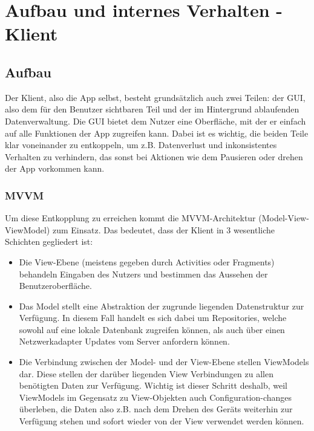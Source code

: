 \documentclass[parskip=full,11pt]{scrartcl}
\begin{document}
\section{Aufbau und internes Verhalten - Klient}

\subsection{Aufbau}
Der Klient, also die App selbst, besteht grundsätzlich auch zwei Teilen:
der GUI, also dem für den Benutzer sichtbaren Teil und der im Hintergrund
ablaufenden Datenverwaltung.
Die GUI bietet dem Nutzer eine Oberfläche, mit der er einfach auf alle
Funktionen der App zugreifen kann.
Dabei ist es wichtig, die beiden Teile klar voneinander zu entkoppeln,
um z.B. Datenverlust und inkonsistentes Verhalten zu verhindern, das sonst
bei Aktionen wie dem Pausieren oder drehen der App vorkommen kann.

\subsubsection{MVVM}
Um diese Entkopplung zu erreichen kommt die MVVM-Architektur
(Model-View-ViewModel) zum Einsatz.
Das bedeutet, dass der Klient in 3 wesentliche Schichten gegliedert ist:
\begin{itemize}
	\item Die View-Ebene (meistens gegeben durch Activities oder Fragments)
        behandeln Eingaben des Nutzers und bestimmen das Aussehen der
        Benutzeroberfläche.
	\item Das Model stellt eine Abstraktion der zugrunde liegenden
        Datenstruktur zur Verfügung. In diesem Fall handelt es sich dabei um
        Repositories, welche sowohl auf eine lokale Datenbank zugreifen können,
        als auch über einen Netzwerkadapter Updates vom Server anfordern
        können.
	\item Die Verbindung zwischen der Model- und der View-Ebene stellen
        ViewModels dar. Diese stellen der darüber liegenden View Verbindungen
        zu allen benötigten Daten zur Verfügung.
	    Wichtig ist dieser Schritt deshalb, weil ViewModels im Gegensatz zu
        View-Objekten auch Configuration-changes überleben, die Daten also z.B.
        nach dem Drehen des Geräts weiterhin zur Verfügung stehen und sofort
        wieder von der View verwendet werden können.
\end{itemize}
\end{document}
